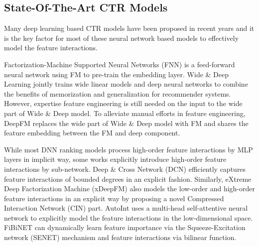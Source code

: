 \documentclass[sigconf]{acmart}
\begin{document}
\subsection{State-Of-The-Art CTR Models}



Many deep learning based CTR models have  been proposed in recent years and it is the key factor for most of these neural network based models to effectively model the feature interactions.


Factorization-Machine Supported Neural Networks (FNN)\cite{zhang2016deep} is a feed-forward neural network using FM to pre-train the embedding layer. Wide \& Deep Learning\cite{xiao2017attentional} jointly trains wide linear models and deep neural networks to combine the benefits of memorization and generalization for recommender systems. However, expertise feature engineering is still needed on the input to the wide part of Wide \& Deep model. To alleviate manual efforts in feature engineering, DeepFM\cite{guo2017deepfm} replaces the wide part of Wide \& Deep model with FM and shares the feature embedding between the FM and deep component.


While most DNN ranking models process high-order feature interactions by MLP layers in implicit way, some works explicitly introduce high-order feature interactions by sub-network. Deep \& Cross Network (DCN)\cite{wang2017deep} efficiently captures feature interactions of bounded degrees in an explicit fashion. Similarly, eXtreme Deep Factorization Machine (xDeepFM) \cite{lian2018xdeepfm} also models the low-order and high-order feature interactions in an explicit way by proposing a novel Compressed Interaction Network (CIN) part. AutoInt\cite{song2019autoint} uses a multi-head self-attentive neural network to explicitly model the feature interactions in the low-dimensional space. FiBiNET\cite{huang2019fibinet} can dynamically learn feature importance via the Squeeze-Excitation network (SENET) mechanism and feature interactions via bilinear function.
\end{document}

